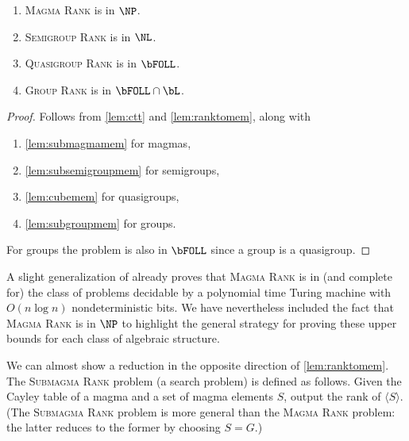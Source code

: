 \documentclass{article}
\newcommand{\todo}[1]{\textbf{TODO #1}}
\newcommand{\gen}[1]{\langle #1 \rangle}
\begin{document}

\begin{theorem}\label{thm:rank}
  \mbox{}
  \begin{enumerate}
  \item \textsc{Magma Rank} is in $\NP$.
  \item \textsc{Semigroup Rank} is in $\NL$.
  \item \textsc{Quasigroup Rank} is in $\bFOLL$.
  \item \textsc{Group Rank} is in $\bFOLL \cap \bL$.
  \end{enumerate}
\end{theorem}
\begin{proof}
  Follows from \autoref{lem:ctt} and \autoref{lem:ranktomem}, along with
  \begin{enumerate}
  \item \autoref{lem:submagmamem} for magmas,
  \item \autoref{lem:subsemigroupmem} for semigroups,
  \item \autoref{lem:cubemem} for quasigroups,
  \item \autoref{lem:subgroupmem} for groups.
  \end{enumerate}
  For groups the problem is also in $\bFOLL$ since a group is a quasigroup.
\end{proof}

A slight generalization of \autocite[Theorem~7]{py96} already proves that \textsc{Magma Rank} is in (and complete for) the class of problems decidable by a polynomial time Turing machine with $O(n \log n)$ nondeterministic bits.
We have nevertheless included the fact that \textsc{Magma Rank} is in $\NP$ to highlight the general strategy for proving these upper bounds for each class of algebraic structure.

We can almost show a reduction in the opposite direction of \autoref{lem:ranktomem}.
The \textsc{Submagma Rank} problem (a search problem) is defined as follows.
Given the Cayley table of a magma and a set of magma elements $S$, output the rank of $\gen{S}$.
(The \textsc{Submagma Rank} problem is more general than the \textsc{Magma Rank} problem: the latter reduces to the former by choosing $S = G$.)
\end{document}
